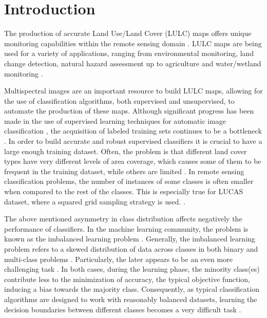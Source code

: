\documentclass[remotesensing,article,submit,moreauthors,pdftex]{Definitions/mdpi}
\begin{document}
\section{Introduction}
The production of accurate Land Use/Land Cover (LULC) maps offers unique
monitoring capabilities within the remote sensing domain \cite{Mellor2015}. LULC
maps are being used for a variety of applications, ranging from environmental
monitoring, land change detection, natural hazard assessment up to agriculture
and water/wetland monitoring \cite{Khatami2016}.

Multispectral images are an important resource to build LULC maps, allowing for
the use of classification algorithms, both supervised and unsupervised, to
automate the production of these maps. Although significant progress has been
made in the use of supervised learning techniques for automatic image
classification \cite{Tewkesbury2015}, the acquisition of labeled training sets
continues to be a bottleneck \cite{Rajan2008}. In order to build accurate and
robust supervised classifiers it is crucial to have a large enough training
dataset. Often, the problem is that different land cover types have very
different levels of area coverage, which causes some of them to be frequent in
the training dataset, while others are limited \cite{Feng2019}. In remote
sensing classification problems, the number of instances of some classes is
often smaller when compared to the rest of the classes. This is especially true
for LUCAS dataset, where a squared grid sampling strategy is used.
\cite{Williams2009, Cenggoro2018}.


The above mentioned asymmetry in class distribution affects negatively the
performance of classifiers. In the machine learning community, the problem is
known as the imbalanced learning problem \cite{Chawla2004}. Generally, the
imbalanced learning problem refers to a skewed distribution of data across
classes in both binary and multi-class problems \cite{Abdi2016}. Particularly,
the later appears to be an even more challenging task \cite{Garcia2018}. In both
cases, during the learning phase, the minority class(es) contribute less to the
minimization of accuracy, the typical objective function, inducing a bias
towards the majority class. Consequently, as typical classification algorithms
are designed to work with reasonably balanced datasets, learning the decision
boundaries between different classes becomes a very difficult task
\cite{Saez2016}.
\end{document}
